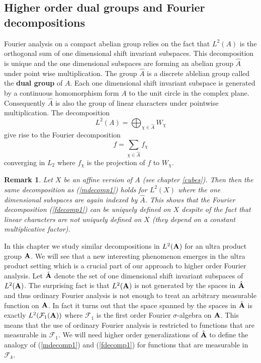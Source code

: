 \documentclass [11pt] {article}
\newtheorem{remark}{Remark}[section]
\def\bA{{\bf A}}
\begin{document}
\subsection{Higher order dual groups and Fourier decompositions}

Fourier analysis on a compact abelian group relies on the fact that $L^2(A)$ is the orthogonal sum of one dimensional shift invariant subspaces. This decomposition is unique and the one dimensional subspaces are forming an abelian group $\hat{A}$ under point wise multiplication. The group $\hat{A}$ is a discrete ablelian group called the {\bf dual group} of $A$. Each one dimensional shift invariant subspace is generated by a continuous homomorphism form $A$ to the unit circle in the complex plane. Consequently $\hat{A}$ is also the group of linear characters under pointwise multiplication. 
The decomposition 
\begin{equation}\label{mdecomp1}
L^2(A)=\bigoplus_{\chi\in\hat{A}}W_\chi
\end{equation}
give rise to the Fourier decomposition
\begin{equation}\label{fdecomp1}
f=\sum_{\chi\in\hat{A}}f_\chi
\end{equation}
converging in $L_2$ where $f_\chi$ is the projection of $f$ to $W_\chi$. 

\begin{remark} Let $X$ be an affine version of $A$ (see chapter \ref{cubes}). Then then the same decomposition as (\ref{mdecomp1}) holds for $L^2(X)$ where the one dimensional subspaces are again indexed by $\hat{A}$. This shows that the Fourier decomposition (\ref{fdecomp1}) can be uniquely defined on $X$ despite of the fact that linear characters are not uniquely defined on $X$ (they depend on a constant multiplicative factor).
\end{remark}

In this chapter we study similar decompositions in $L^2(\bA)$ for an ultra product group $\bA$. We will see that a new interesting phenomenon emerges in the ultra product setting which is a crucial part of our approach to higher order Fourier analysis.
Let $\hat{\bA}$ denote the set of one dimensional shift invariant subspaces of $L^2(\bA)$. The surprising fact is that $L^2(\bA)$ is not generated by the spaces in $\hat{\bA}$ and thus ordinary Fourier analysis is not enough to treat an arbitrary measurable function on $\bA$. In fact it turns out that the space spanned by the spaces in $\hat{\bA}$ is exactly $L^2(\mathcal{F}_1(\bA))$ where $\mathcal{F}_1$ is the first order Fourier $\sigma$-algebra on $\bA$.
This means that the use of ordinary Fourier analysis is restricted to functions that are measurable in $\mathcal{F}_1$.
We will need higher order generalizations of $\hat{\bA}$ to define the analogy of (\ref{mdecomp1}) and (\ref{fdecomp1}) for functions that are measurable in $\mathcal{F}_k$. 
\end{document}
